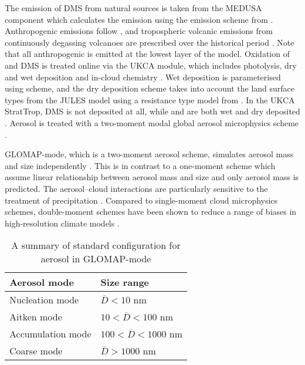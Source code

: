 The emission of DMS from natural sources is taken from the MEDUSA component which calculates the emission using the emission scheme from \citet{lissAirSeaGasExchange1986}. Anthropogenic  emissions follow \citet{hoeslyHistorical175020142018}, and tropospheric volcanic emissions from continuously degassing volcanoes are prescribed over the historical period \citep{andresTimeaveragedInventorySubaerial1998, dentenerEmissionsPrimaryAerosol2006}.  Note that all anthropogenic  is emitted at the lowest layer of the model. Oxidation of  and DMS is treated online via the UKCA module, which includes photolysis, dry and wet deposition and in-cloud chemistry \citep{mulcahyDescriptionEvaluationAerosol2020}. Wet deposition is parameterised using \citet{giannakopoulosValidationIntercomparisonWet1999} scheme, and the dry deposition scheme takes into account the land surface types from the JULES model using a resistance type model from \citet{weselyParameterizationSurfaceResistances1989}. In the UKCA StratTrop, DMS is not deposited at all, while  and  are both wet and dry deposited \citep{archibaldDescriptionEvaluationUKCA2020}. Aerosol is treated with a two-moment modal global aerosol microphysics scheme \citep[GLOMAP-mode;][]{mannDescriptionEvaluationGLOMAPmode2010}. 

GLOMAP-mode, which is a two-moment aerosol scheme, simulates aerosol mass and size independently \citep{mannDescriptionEvaluationGLOMAPmode2010}. This is in contrast to a one-moment scheme which assume linear relationship between aerosol mass and size and only aerosol mass is predicted. The aerosol–cloud interactions are particularly sensitive to the treatment of precipitation \citep{gettelmanAdvancedTwoMomentBulk2015}. Compared to single-moment cloud microphysics schemes, double-moment schemes have been shown to reduce a range of biases in high-resolution climate models \citep{seikiImprovementGlobalCloudSystemResolving2015}. 

\begin{table}
   \caption[Standard configuration for aerosol in GLOMAP-mode]{A summary of standard configuration for aerosol in GLOMAP-mode \citep{mannDescriptionEvaluationGLOMAPmode2010}}
   \label{tab:glomap}
   \centering
   \begin{tabular}{l l}
    \toprule
     Aerosol mode & Size range  \\
    \midrule
     Nucleation mode & $\overline{D} < 10$ nm \\ 
     Aitken mode & $10 < \overline{D} < 100$ nm \\
     Accumulation mode & $100 < \overline{D} < 1000$ nm\\
     Coarse mode & $ \overline{D} > 1000$ nm\\
     \bottomrule
   \end{tabular}
\end{table}



